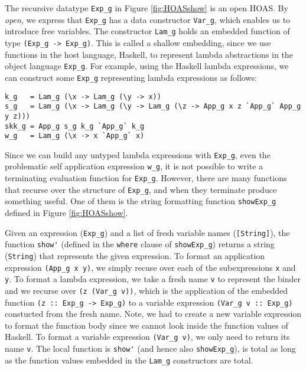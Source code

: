 The recursive datatype \verb|Exp_g| in Figure \ref{fig:HOASshow}
is an open HOAS. By \emph{open}, we express that \verb|Exp_g| has
a data constructor \verb|Var_g|, which enables us to introduce free variables.
The constructor \verb|Lam_g| holds an embedded function of type
\verb|(Exp_g -> Exp_g)|.
This is called a shallow embedding, since we use functions in the host language,
Haskell, to represent lambda abstractions in the object language \verb|Exp_g|.
For example, using the Haskell lambda expressions,
we can construct some \verb|Exp_g| representing lambda expressions as follows:
\begin{verbatim}
k_g   = Lam_g (\x -> Lam_g (\y -> x))
s_g   = Lam_g (\x -> Lam_g (\y -> Lam_g (\z -> App_g x z `App_g` App_g y z)))
skk_g = App_g s_g k_g `App_g` k_g
w_g   = Lam_g (\x -> x `App_g` x)
\end{verbatim}
Since we can build any untyped lambda expressions with \verb|Exp_g|, 
even the problematic self application expression \verb|w_g|,
it is not possible to write a terminating evaluation function for \verb|Exp_g|.
However, there are many  functions that recurse over the structure of
\verb|Exp_g|, and when they terminate produce something useful.
One of them is the string formatting function \verb|showExp_g| defined in
Figure \ref{fig:HOASshow}.

Given an expression (\verb|Exp_g|) and a list of fresh variable names
(\verb|[String]|), the function \verb|show'| (defined in the \verb|where|
clause of \verb|showExp_g|) returns a string (\verb|String|) that represents
the given expression.  To format an application expression \verb|(App_g x y)|,
we simply recuse over each of the subexpressions \verb|x| and \verb|y|.
To format a lambda expression, we take a fresh name \verb|v| to represent
the binder and we recurse over \verb|(z (Var_g v))|, which is the application of
the embedded function \verb|(z :: Exp_g -> Exp_g)| to a variable expression
\verb|(Var_g v :: Exp_g)| constucted from the fresh name.
Note, we had to create a new variable expression to format the function body
since we cannot look inside the function values of Haskell.
To format a variable expression \verb|(Var_g v)|,
we only need to return its name \verb|v|.  The local function is \verb|show'|
(and hence also \verb|showExp_g|), is total as long as
the function values embedded in the \verb|Lam_g| constructors are total.

